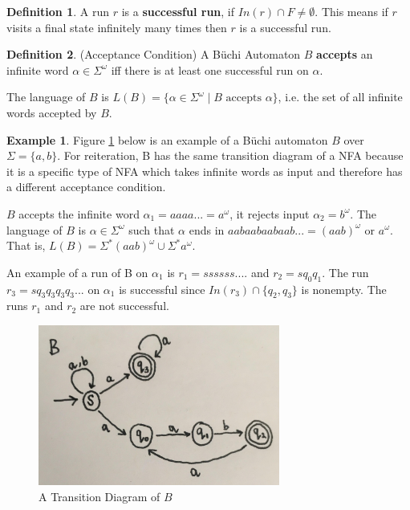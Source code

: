 \documentclass[a4paper,12pt]{report}
\theoremstyle{definition}
\newtheorem{definition}{Definition}[subsection]
\newtheorem{exmp}{Example}[subsection]
\begin{document}
\begin{definition}
A run $r$ is a \textbf{successful run}, if $In(r) \cap F \neq \emptyset $. 
This means if $r$ visits a final state infinitely many times then $r$ is a successful run. 
\end{definition}

\begin{definition}(Acceptance Condition)
A Büchi Automaton $B$ \textbf{accepts} an infinite word $\alpha\in \Sigma^\omega$ iff there is at least one successful run on $\alpha$. 


The language of $B$ is $L(B)=\{\alpha\in\Sigma^\omega\mid B \text{ accepts }\alpha\}$, i.e. the set of all infinite words accepted by $B$. 
\end{definition}



\begin{exmp}
\label{1stBüchiexmp}
Figure \ref{image-Figure7} below is an example of a Büchi automaton $B$ over $\Sigma=\{a,b\}$. For reiteration, B has the same transition diagram of a NFA because it is a specific type of NFA which takes infinite words as input and therefore has a different acceptance condition.


$B$ accepts the infinite word $\alpha_1=aaaa...=a^\omega$, it rejects input $\alpha_2 = b^\omega$. The language of $B$ is $\alpha\in\Sigma^\omega$ such that $\alpha$ ends in $aabaabaabaab...=(aab)^\omega$ or $a^\omega$. That is,
$L(B)=\Sigma^*(aab)^\omega\cup\Sigma^*a^\omega$.

An example of a run of B on $\alpha_1$ is $r_1= ssssss....$ and $r_2= sq_0q_1$. The run  $r_3=sq_3q_3q_3q_3...$ on $\alpha_1$ is successful since $In(r_3)\cap \{q_2, q_3\}$ is nonempty. The runs $r_1$ and $r_2$ are not successful. 

\begin{figure}[ht]
\centering
\includegraphics[width=300px]{figure1.7.jpg}
\caption{A Transition Diagram of $B$}
\label{image-Figure7}
\end{figure}
\end{exmp}
\end{document}
